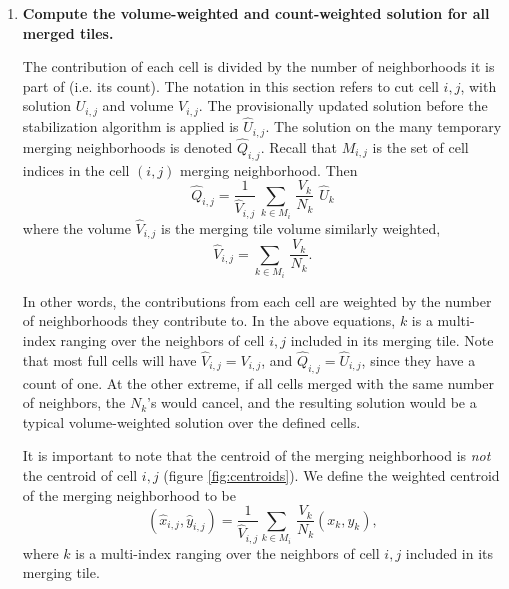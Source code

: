 \begin{enumerate}
\item
{\bf Compute the volume-weighted and count-weighted solution for all
merged tiles.}   

\vspace*{.1in}
The contribution of each cell is divided by the number of neighborhoods 
it is part of (i.e. its count). The notation in this section refers
to cut cell $i,j$, with solution $U_{i,j}$ and volume
$V_{i,j}$. 
The provisionally updated solution before the
stabilization algorithm is applied is $\widehat{U}_{i,j}$.
The solution on the many temporary merging neighborhoods 
is denoted  $\widehat{Q}_{i,j}$. 
Recall that $M_{i,j}$ is the set of cell indices in the cell $(i,j)$ merging
neighborhood.  Then
\begin{equation}
\label{tiledef}
\widehat{Q}_{i,j} =  \frac{1}{{\widehat V}_{i,j}} \, \sum_{k \in M_i} \,  
\frac{V_k}{N_k}  \,\,  \widehat{U}_k
\end{equation}
where the volume ${\widehat V}_{i,j}$ is the merging tile volume similarly weighted,
\begin{equation}
\label{voldef}
{\widehat V}_{i,j} =  \sum_{k \in M_i } \,  \frac{V_k}{N_k}  .
\end{equation}

In other words, the contributions from each cell are weighted by the
number of neighborhoods they contribute to.
In the above equations, $k$ is  a multi-index ranging over the neighbors 
of cell $i,j$ included in its merging tile.
Note that most full cells will have ${\widehat V}_{i,j} = V_{i,j}$, 
and $\widehat{Q}_{i,j}  = \widehat{U}_{i,j}$, since they have a count of one.
At the other extreme, if all cells merged with the same number of neighbors, the $N_k$'s
would cancel, and the resulting solution would be a typical volume-weighted
solution over the defined cells.

It is important to note that the centroid of the merging neighborhood is \textit{not} the centroid of cell ${i,j}$ (figure \ref{fig:centroids}).  We define the weighted centroid of the merging neighborhood to be
\begin{equation}
\label{centroiddef}
({\widehat x}_{i,j},{\widehat y}_{i,j}) = \frac{1}{\widehat V_{i,j}} \sum_{k \in M_i } \,  \frac{V_k}{N_k}(x_k,y_k),
\end{equation}
where $k$ is a multi-index ranging over the neighbors 
of cell $i,j$ included in its merging tile.


\end{enumerate}

